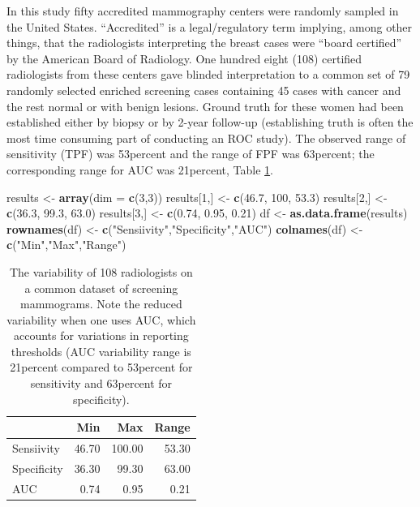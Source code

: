 \documentclass[
]{book}
\newenvironment{Shaded}{\begin{snugshade}}{\end{snugshade}}
\newcommand{\DataTypeTok}[1]{\textcolor[rgb]{0.13,0.29,0.53}{#1}}
\newcommand{\DecValTok}[1]{\textcolor[rgb]{0.00,0.00,0.81}{#1}}
\newcommand{\FloatTok}[1]{\textcolor[rgb]{0.00,0.00,0.81}{#1}}
\newcommand{\KeywordTok}[1]{\textcolor[rgb]{0.13,0.29,0.53}{\textbf{#1}}}
\newcommand{\NormalTok}[1]{#1}
\newcommand{\StringTok}[1]{\textcolor[rgb]{0.31,0.60,0.02}{#1}}
\begin{document}
In this study \citep{RN1087} fifty accredited mammography centers were randomly sampled in the United States. ``Accredited'' is a legal/regulatory term implying, among other things, that the radiologists interpreting the breast cases were ``board certified'' by the American Board of Radiology. One hundred eight (108) certified radiologists from these centers gave blinded interpretation to a common set of 79 randomly selected enriched screening cases containing 45 cases with cancer and the rest normal or with benign lesions. Ground truth for these women had been established either by biopsy or by 2-year follow-up (establishing truth is often the most time consuming part of conducting an ROC study). The observed range of sensitivity (TPF) was 53percent and the range of FPF was 63percent; the corresponding range for AUC was 21percent, Table \ref{tab:binary-task-model-table-beam-study}.

\begin{Shaded}
\begin{Highlighting}[]
\NormalTok{results <-}\StringTok{ }\KeywordTok{array}\NormalTok{(}\DataTypeTok{dim =} \KeywordTok{c}\NormalTok{(}\DecValTok{3}\NormalTok{,}\DecValTok{3}\NormalTok{))}
\NormalTok{results[}\DecValTok{1}\NormalTok{,] <-}\StringTok{ }\KeywordTok{c}\NormalTok{(}\FloatTok{46.7}\NormalTok{, }\DecValTok{100}\NormalTok{, }\FloatTok{53.3}\NormalTok{)}
\NormalTok{results[}\DecValTok{2}\NormalTok{,] <-}\StringTok{ }\KeywordTok{c}\NormalTok{(}\FloatTok{36.3}\NormalTok{, }\FloatTok{99.3}\NormalTok{, }\FloatTok{63.0}\NormalTok{)}
\NormalTok{results[}\DecValTok{3}\NormalTok{,] <-}\StringTok{ }\KeywordTok{c}\NormalTok{(}\FloatTok{0.74}\NormalTok{, }\FloatTok{0.95}\NormalTok{, }\FloatTok{0.21}\NormalTok{)}
\NormalTok{df <-}\StringTok{ }\KeywordTok{as.data.frame}\NormalTok{(results)}
\KeywordTok{rownames}\NormalTok{(df) <-}\StringTok{ }\KeywordTok{c}\NormalTok{(}\StringTok{"Sensiivity"}\NormalTok{,}\StringTok{"Specificity"}\NormalTok{,}\StringTok{"AUC"}\NormalTok{)}
\KeywordTok{colnames}\NormalTok{(df) <-}\StringTok{ }\KeywordTok{c}\NormalTok{(}\StringTok{"Min"}\NormalTok{,}\StringTok{"Max"}\NormalTok{,}\StringTok{"Range"}\NormalTok{)}
\end{Highlighting}
\end{Shaded}

\begin{table}

\caption{\label{tab:binary-task-model-table-beam-study}The variability of 108 radiologists on a common dataset of screening mammograms. Note the reduced variability when one uses AUC, which accounts for variations in reporting thresholds (AUC variability range is 21percent compared to 53percent for sensitivity and 63percent for specificity).}
\centering
\begin{tabular}[t]{l|r|r|r}
\hline
  & Min & Max & Range\\
\hline
Sensiivity & 46.70 & 100.00 & 53.30\\
\hline
Specificity & 36.30 & 99.30 & 63.00\\
\hline
AUC & 0.74 & 0.95 & 0.21\\
\hline
\end{tabular}
\end{table}
\end{document}
